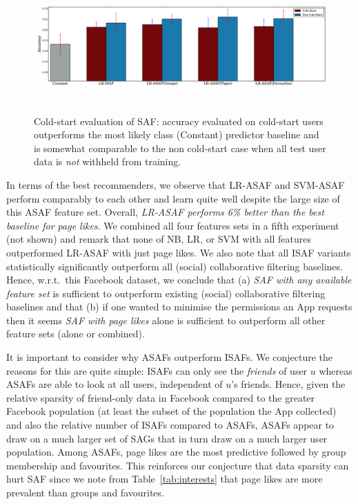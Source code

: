 \begin{figure}[tbh!]
\centering
\includegraphics[width=180mm,height=50mm]{data/newPlots/cold_start.eps}
\vspace{-6mm}
\caption{Cold-start evaluation of SAF: accuracy evaluated on cold-start users 
  outperforms the most likely class (Constant) predictor baseline and is
  somewhat comparable to the non cold-start case when all test user data is \emph{not}
  withheld from training.}
\label{fig:coldstart}
\end{figure}
 

In terms of the best recommenders, we observe that LR-ASAF and
SVM-ASAF perform comparably to each other and learn quite well despite
the large size of this ASAF feature set.  Overall, \emph{LR-ASAF
  performs 6\% better than the best baseline for page likes}.  We
combined all four features sets in a fifth experiment (not shown) and
remark that none of NB, LR, or SVM with all features outperformed
LR-ASAF with just page likes.  We also note that all ISAF variants
statistically significantly outperform all (social) collaborative
filtering baselines.  Hence, w.r.t.\ this Facebook dataset, we
conclude that (a) \emph{SAF with any available feature set} is sufficient
to outperform existing (social) collaborative filtering baselines and
that (b) if one wanted to minimise the permissions an App requests
then it seems \emph{SAF with page likes} alone is sufficient to
outperform all other feature sets (alone or combined).

It is important to consider why ASAFs outperform ISAFs.  We conjecture
the reasons for this are quite simple: ISAFs can only see the
\emph{friends} of user $u$ whereas ASAFs are able to look at all
users, independent of $u$'s friends.  Hence, given the relative
sparsity of friend-only data in Facebook compared to the greater
Facebook population (at least the subset of the population the App
collected) and also the relative number of ISAFs compared to ASAFs,
ASAFs appear to draw on a much larger set of SAGs that in turn draw on
a much larger user population.  Among ASAFs, page likes are the most
predictive followed by group membership and favourites.  This
reinforces our conjecture that data sparsity can hurt SAF since we
note from Table~\ref{tab:interests} that page likes are more prevalent
than groups and favourites.

